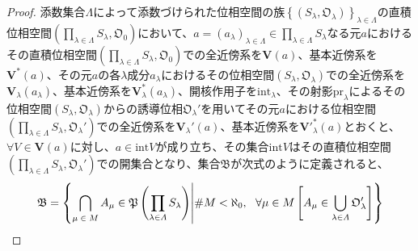 \documentclass[dvipdfmx]{jsarticle}
\begin{document}
\begin{proof}
添数集合$\varLambda$によって添数づけられた位相空間の族$\left\{ \left( S_{\lambda},\mathfrak{O}_{\lambda} \right) \right\}_{\lambda \in \varLambda}$の直積位相空間$\left( \prod_{\lambda \in \varLambda} S_{\lambda},\mathfrak{O}_{0} \right)$において、$a = \left( a_{\lambda} \right)_{\lambda \in \varLambda} \in \prod_{\lambda \in \varLambda} S_{\lambda}$なる元$a$におけるその直積位相空間$\left( \prod_{\lambda \in \varLambda} S_{\lambda},\mathfrak{O}_{0} \right)$での全近傍系を$\mathbf{V}(a)$、基本近傍系を$\mathbf{V}^{*}(a)$、その元$a$の各$\lambda$成分$a_{\lambda}$におけるその位相空間$\left( S_{\lambda},\mathfrak{O}_{\lambda} \right)$での全近傍系を$\mathbf{V}_{\lambda}\left( a_{\lambda} \right)$、基本近傍系を$\mathbf{V}_{\lambda}^{*}\left( a_{\lambda} \right)$、開核作用子を${\mathrm{int}}_{\lambda}$、その射影${\mathrm{pr}}_{\lambda}$によるその位相空間$\left( S_{\lambda},\mathfrak{O}_{\lambda} \right)$からの誘導位相$\mathfrak{O}_{\lambda}'$を用いてその元$a$における位相空間$\left( \prod_{\lambda \in \varLambda} S_{\lambda},\mathfrak{O}_{\lambda}' \right)$での全近傍系を$\mathbf{V}_{\lambda}'(a)$、基本近傍系を${\mathbf{V}'}_{\lambda}^{*}(a)$とおくと、$\forall V \in \mathbf{V}(a)$に対し、$a \in {\mathrm{int}}V$が成り立ち、その集合${\mathrm{int}}V$はその直積位相空間$\left( \prod_{\lambda \in \varLambda} S_{\lambda},\mathfrak{O}_{\lambda}' \right)$での開集合となり、集合$\mathfrak{B}$が次式のように定義されると、
\begin{align*}
\mathfrak{B} = \left\{ \bigcap_{\scriptsize \begin{matrix}
\mu \in M \\
\end{matrix}} A_{\mu}\in \mathfrak{P}\left( \prod_{\lambda \in \varLambda} S_{\lambda} \right) \middle| {\#}M < \aleph_{0},\ \ \forall\mu \in M\left[ A_{\mu} \in \bigcup_{\lambda \in \varLambda} \mathfrak{O}_{\lambda}' \right] \right\}
\end{align*}

\end{proof}
\end{document}
